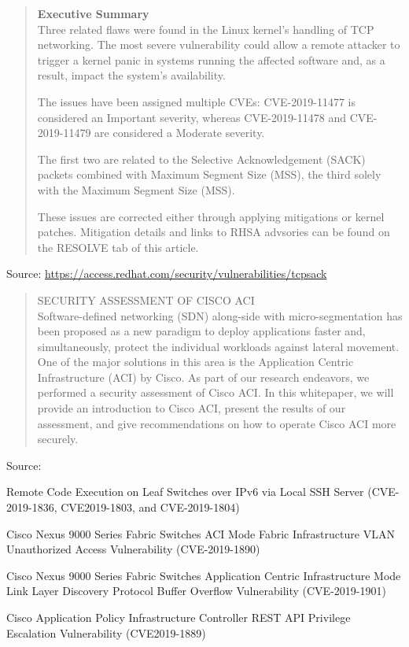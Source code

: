 \documentclass[Screen16to9,17pt]{foils}
\begin{document}
\begin{quote}\footnotesize{\bf
Executive Summary}\\
Three related flaws were found in the Linux kernel’s handling of TCP networking.  The most severe vulnerability could allow a remote attacker to trigger a kernel panic in systems running the affected software and, as a result, impact the system’s availability.

The issues have been assigned multiple CVEs: CVE-2019-11477 is considered an Important severity, whereas CVE-2019-11478 and CVE-2019-11479 are considered a Moderate severity.

The first two are related to the Selective Acknowledgement (SACK) packets combined with Maximum Segment Size (MSS), the third solely with the Maximum Segment Size (MSS).

These issues are corrected either through applying mitigations or kernel patches.  Mitigation details and links to RHSA advsories can be found on the RESOLVE tab of this article.
\end{quote}

Source: {\footnotesize\url{https://access.redhat.com/security/vulnerabilities/tcpsack}}




\begin{quote}\small
  SECURITY ASSESSMENT OF CISCO ACI\\
  Software-defined networking (SDN) along-side with micro-segmentation has been proposed as a new paradigm to deploy applications faster and, simultaneously, protect the individual workloads against lateral movement. One of the major solutions in this area is the Application Centric Infrastructure (ACI) by Cisco. As part of our research endeavors, we performed a security assessment of Cisco ACI. In this whitepaper, we will provide an introduction to Cisco ACI, present the results of our assessment, and give recommendations on how to operate Cisco ACI more securely.
\end{quote}{\footnotesize
Source: }

\begin{list2}\footnotesize
\item Remote Code Execution on Leaf Switches over IPv6 via Local SSH Server (CVE-2019-1836, CVE2019-1803, and CVE-2019-1804)
\item Cisco Nexus 9000 Series Fabric Switches ACI Mode Fabric Infrastructure VLAN Unauthorized
  Access Vulnerability (CVE-2019-1890)
\item Cisco Nexus 9000 Series Fabric Switches Application Centric Infrastructure Mode Link Layer
  Discovery Protocol Buffer Overflow Vulnerability (CVE-2019-1901)
\item Cisco Application Policy Infrastructure Controller REST API Privilege Escalation Vulnerability (CVE2019-1889)
\end{list2}


\slidenext
\end{document}
